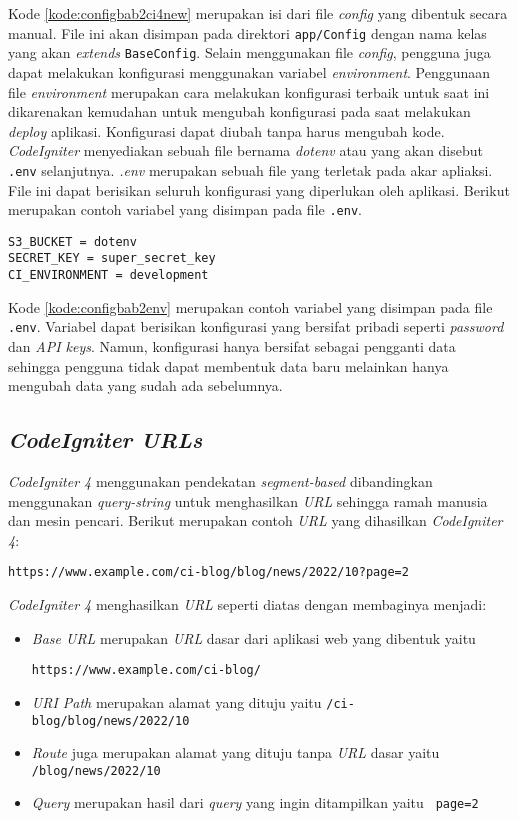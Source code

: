 Kode \ref{kode:configbab2ci4new} merupakan isi dari file \textit{config} yang dibentuk secara manual. File ini akan disimpan pada direktori \texttt{app/Config} dengan nama kelas yang akan \textit{extends} \texttt{BaseConfig}. Selain menggunakan file \textit{config}, pengguna juga dapat melakukan konfigurasi menggunakan variabel \textit{environment}. Penggunaan file \textit{environment} merupakan cara melakukan konfigurasi terbaik untuk saat ini dikarenakan kemudahan untuk mengubah konfigurasi pada saat melakukan \textit{deploy} aplikasi. Konfigurasi dapat diubah tanpa harus mengubah kode. \textit{CodeIgniter} menyediakan sebuah file bernama \textit{dotenv} atau yang akan disebut \texttt{.env} selanjutnya. \textit{.env} merupakan sebuah file yang terletak pada akar apliaksi. File ini dapat berisikan seluruh konfigurasi yang diperlukan oleh aplikasi. Berikut merupakan contoh variabel yang disimpan pada file \texttt{.env}.
\begin{lstlisting}[caption=Contoh variabel yang disimpan pada file \texttt{.env}. ,label=kode:configbab2env]
S3_BUCKET = dotenv
SECRET_KEY = super_secret_key
CI_ENVIRONMENT = development
\end{lstlisting}
Kode \ref{kode:configbab2env} merupakan contoh variabel yang disimpan pada file \texttt{.env}. Variabel dapat berisikan konfigurasi yang bersifat pribadi seperti \textit{password} dan \textit{API keys}. Namun, konfigurasi hanya bersifat sebagai pengganti data sehingga pengguna tidak dapat membentuk data baru melainkan hanya mengubah data yang sudah ada sebelumnya.

\subsection{\textit{CodeIgniter URLs}}
\textit{CodeIgniter 4} menggunakan pendekatan \textit{segment-based} dibandingkan menggunakan \textit{query-string} untuk menghasilkan \textit{URL} sehingga ramah manusia dan mesin pencari. Berikut merupakan contoh \textit{URL} yang dihasilkan \textit{CodeIgniter 4}:

\begin{center}
\texttt{https://www.example.com/ci-blog/blog/news/2022/10?page=2}
\end{center}

\textit{CodeIgniter 4} menghasilkan \textit{URL} seperti diatas dengan membaginya menjadi:

\begin{itemize}
\item \textit{Base URL} merupakan \textit{URL} dasar dari aplikasi web yang dibentuk yaitu 
\begin{center}
	\texttt{https://www.example.com/ci-blog/}
\end{center}
\item \textit{URI Path} merupakan alamat yang dituju yaitu \texttt{/ci-blog/blog/news/2022/10} 
\item \textit{Route} juga merupakan alamat yang dituju tanpa \textit{URL} dasar yaitu \texttt{/blog/news/2022/10} 
\item \textit{Query} merupakan hasil dari \textit{query} yang ingin ditampilkan yaitu \texttt{	
page=2}
\end{itemize}

